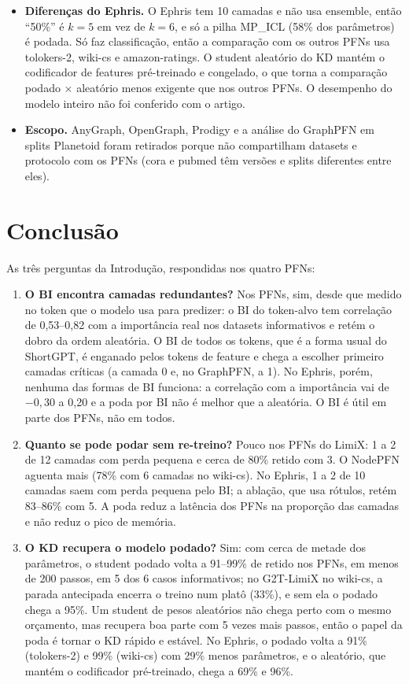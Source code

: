 \documentclass[12pt,a4paper]{article}
\begin{document}
\begin{itemize}
  \item \textbf{Diferenças do Ephris.} O Ephris tem 10 camadas e não usa ensemble, então ``50\%'' é $k=5$ em vez de $k=6$, e só a pilha MP\_ICL (58\% dos parâmetros) é podada. Só faz classificação, então a comparação com os outros PFNs usa tolokers-2, wiki-cs e amazon-ratings. O student aleatório do KD mantém o codificador de features pré-treinado e congelado, o que torna a comparação podado $\times$ aleatório menos exigente que nos outros PFNs. O desempenho do modelo inteiro não foi conferido com o artigo.
  \item \textbf{Escopo.} AnyGraph, OpenGraph, Prodigy e a análise do GraphPFN em splits Planetoid foram retirados porque não compartilham datasets e protocolo com os PFNs (cora e pubmed têm versões e splits diferentes entre eles).
\end{itemize}


\section{Conclusão}

As três perguntas da Introdução, respondidas nos quatro PFNs:

\begin{enumerate}
  \item \textbf{O BI encontra camadas redundantes?} Nos PFNs, sim, desde que medido no token que o modelo usa para predizer: o BI do token-alvo tem correlação de 0,53--0,82 com a importância real nos datasets informativos e retém o dobro da ordem aleatória. O BI de todos os tokens, que é a forma usual do ShortGPT, é enganado pelos tokens de feature e chega a escolher primeiro camadas críticas (a camada 0 e, no GraphPFN, a 1). No Ephris, porém, nenhuma das formas de BI funciona: a correlação com a importância vai de $-0{,}30$ a 0,20 e a poda por BI não é melhor que a aleatória. O BI é útil em parte dos PFNs, não em todos.
  \item \textbf{Quanto se pode podar sem re-treino?} Pouco nos PFNs do LimiX: 1 a 2 de 12 camadas com perda pequena e cerca de 80\% retido com 3. O NodePFN aguenta mais (78\% com 6 camadas no wiki-cs). No Ephris, 1 a 2 de 10 camadas saem com perda pequena pelo BI; a ablação, que usa rótulos, retém 83--86\% com 5. A poda reduz a latência dos PFNs na proporção das camadas e não reduz o pico de memória.
  \item \textbf{O KD recupera o modelo podado?} Sim: com cerca de metade dos parâmetros, o student podado volta a 91--99\% de retido nos PFNs, em menos de 200 passos, em 5 dos 6 casos informativos; no G2T-LimiX no wiki-cs, a parada antecipada encerra o treino num platô (33\%), e sem ela o podado chega a 95\%. Um student de pesos aleatórios não chega perto com o mesmo orçamento, mas recupera boa parte com 5 vezes mais passos, então o papel da poda é tornar o KD rápido e estável. No Ephris, o podado volta a 91\% (tolokers-2) e 99\% (wiki-cs) com 29\% menos parâmetros, e o aleatório, que mantém o codificador pré-treinado, chega a 69\% e 96\%.
\end{enumerate}
\end{document}
